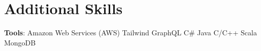  

\section{Additional Skills}
\begin{itemize}[leftmargin=0.15in, label={}]
\small{\item{\textbf{Tools}:
    Amazon Web Services (AWS)\hspace{0.1em}\resumeDot\hspace{0.1em}
    Tailwind\hspace{0.1em}\resumeDot\hspace{0.1em}
    GraphQL\hspace{0.1em}\resumeDot\hspace{0.1em}
    C\#\hspace{0.1em}\resumeDot\hspace{0.1em}
    Java\hspace{0.1em}\resumeDot\hspace{0.1em}
    C/C++\hspace{0.1em}\resumeDot\hspace{0.1em}
    Scala\hspace{0.1em}\resumeDot\hspace{0.1em}
    MongoDB
    }}


\end{itemize}

